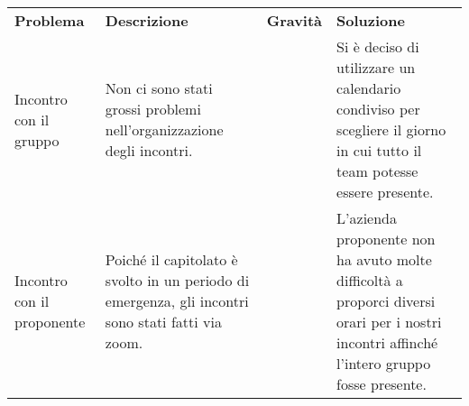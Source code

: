 \begin{table}[H]
    \caption{Tabella delle problematiche relative all'organizzazione}
\renewcommand{\arraystretch}{1.5}
\begin{longtable}{  >{\centering}p{} >{}p{}
    >{\centering}p{} >{}p{}}
    \rowcolor{\primaryColor}
    \textcolor{\secondaryColor}{
    \centering\textbf{Problema}}     & \textcolor{\secondaryColor}{\centering\textbf{Descrizione}}    & \textcolor{\secondaryColor}
    {\centering\textbf{Gravità}} & \textcolor{\secondaryColor}{\centering\textbf{Soluzione}}\\
   
    Incontro con il gruppo  
    & Non ci sono stati grossi problemi nell’organizzazione degli incontri. 
    & 1  
    & Si è deciso di utilizzare un
    calendario condiviso per scegliere il giorno in cui tutto il
    team potesse essere presente.{} \\
    Incontro con il proponente
    & Poiché il capitolato è svolto in un periodo di emergenza, 
    gli incontri sono stati fatti via zoom. 
    & 1
    & L’azienda proponente non ha avuto molte difficoltà a proporci 
    diversi orari per i nostri incontri affinché l’intero gruppo fosse presente.{} \\
    \end{longtable}
\end{table}
